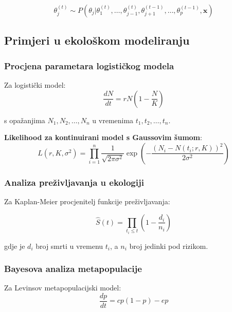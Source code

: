 \documentclass[11pt,oneside]{book}
\begin{document}
\begin{equation}
	\theta_j^{(t)} \sim P(\theta_j | \theta_1^{(t)}, \ldots, \theta_{j-1}^{(t)}, \theta_{j+1}^{(t-1)}, \ldots, \theta_p^{(t-1)}, \mathbf{x})
\end{equation}

\subsection{Primjeri u ekološkom modeliranju}

\subsubsection{Procjena parametara logističkog modela}

Za logistički model:
\begin{equation}
	\frac{dN}{dt} = rN\left(1 - \frac{N}{K}\right)
\end{equation}

s opažanjima $N_1, N_2, \ldots, N_n$ u vremenima $t_1, t_2, \ldots, t_n$.

\textbf{Likelihood za kontinuirani model s Gaussovim šumom}:
\begin{equation}
	L(r, K, \sigma^2) = \prod_{i=1}^n \frac{1}{\sqrt{2\pi\sigma^2}} \exp\left(-\frac{(N_i - N(t_i; r, K))^2}{2\sigma^2}\right)
\end{equation}

\subsubsection{Analiza preživljavanja u ekologiji}

Za Kaplan-Meier procjenitelj funkcije preživljavanja:

\begin{equation}
	\hat{S}(t) = \prod_{t_i \leq t} \left(1 - \frac{d_i}{n_i}\right)
\end{equation}

gdje je $d_i$ broj smrti u vremenu $t_i$, a $n_i$ broj jedinki pod rizikom.

\subsubsection{Bayesova analiza metapopulacije}

Za Levinsov metapopulacijski model:
\begin{equation}
	\frac{dp}{dt} = cp(1-p) - ep
\end{equation}
\end{document}

